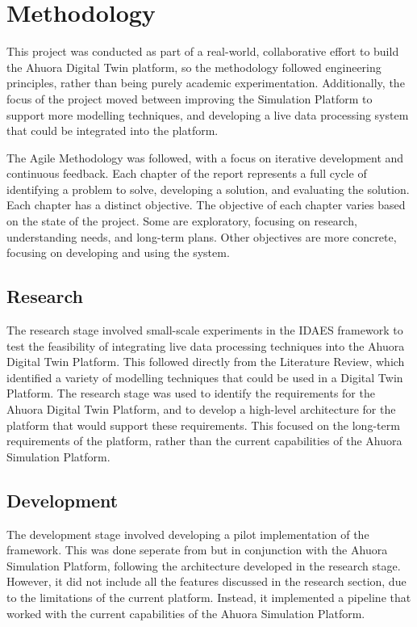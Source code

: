 \chapter{Methodology}

This project was conducted as part of a real-world, collaborative effort to build the Ahuora Digital Twin platform, so the methodology followed engineering principles, rather than being purely academic experimentation. Additionally, the focus of the project moved between improving the Simulation Platform to support more modelling techniques, and developing a live data processing system that could be integrated into the platform.

The Agile Methodology was followed, with a focus on iterative development and continuous feedback. Each chapter of the report represents a full cycle of identifying a problem to solve, developing a solution, and evaluating the solution. Each chapter has a distinct objective. The objective of each chapter varies based on the state of the project. Some are exploratory, focusing on research, understanding needs, and long-term plans. Other objectives are more concrete, focusing on developing and using the system. 



\section{Research}

The research stage involved small-scale experiments in the IDAES framework to test the feasibility of integrating live data processing techniques into the Ahuora Digital Twin Platform. This followed directly from the Literature Review, which identified a variety of modelling techniques that could be used in a Digital Twin Platform. The research stage was used to identify the requirements for the Ahuora Digital Twin Platform, and to develop a high-level architecture for the platform that would support these requirements. This focused on the long-term requirements of the platform, rather than the current capabilities of the Ahuora Simulation Platform.

\section{Development}

The development stage involved developing a pilot implementation of the framework. This was done seperate from but in conjunction with the Ahuora Simulation Platform, following the architecture developed in the research stage. However, it did not include all the features discussed in the research section, due to the limitations of the current platform. Instead, it implemented a pipeline that worked with the current capabilities of the Ahuora Simulation Platform.

